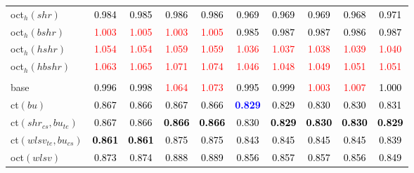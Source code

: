 \begin{tabular}[t]{l|ccccccccc}
oct$_h(shr)$ & \textcolor{black}{0.984} & \textcolor{black}{0.985} & \textcolor{black}{0.986} & \textcolor{black}{0.986} & \textcolor{black}{0.969} & \textcolor{black}{0.969} & \textcolor{black}{0.969} & \textcolor{black}{0.968} & \textcolor{black}{0.971}\\
oct$_h(bshr)$ & \textcolor{red}{1.003} & \textcolor{red}{1.005} & \textcolor{red}{1.003} & \textcolor{red}{1.005} & \textcolor{black}{0.985} & \textcolor{black}{0.987} & \textcolor{black}{0.987} & \textcolor{black}{0.986} & \textcolor{black}{0.987}\\
oct$_h(hshr)$ & \textcolor{red}{1.054} & \textcolor{red}{1.054} & \textcolor{red}{1.059} & \textcolor{red}{1.059} & \textcolor{red}{1.036} & \textcolor{red}{1.037} & \textcolor{red}{1.038} & \textcolor{red}{1.039} & \textcolor{red}{1.040}\\
oct$_h(hbshr)$ & \textcolor{red}{1.063} & \textcolor{red}{1.065} & \textcolor{red}{1.071} & \textcolor{red}{1.074} & \textcolor{red}{1.046} & \textcolor{red}{1.048} & \textcolor{red}{1.049} & \textcolor{red}{1.051} & \textcolor{red}{1.051}\\
\addlinespace[0.3em]
\multicolumn{10}{c}{\textbf{$k = 2$}}\\
base & \textcolor{black}{0.996} & \textcolor{black}{0.998} & \textcolor{red}{1.064} & \textcolor{red}{1.073} & \textcolor{black}{0.995} & \textcolor{black}{0.999} & \textcolor{red}{1.003} & \textcolor{red}{1.007} & \textcolor{black}{1.000}\\
ct$(bu)$ & \textcolor{black}{0.867} & \textcolor{black}{0.866} & \textcolor{black}{0.867} & \textcolor{black}{0.866} & \textcolor{blue}{\textbf{0.829}} & \textcolor{black}{0.829} & \textcolor{black}{0.830} & \textcolor{black}{0.830} & \textcolor{black}{0.831}\\
ct$(shr_{cs}, bu_{te})$ & \textcolor{black}{0.867} & \textcolor{black}{0.866} & \textcolor{black}{\textbf{0.866}} & \textcolor{black}{\textbf{0.866}} & \textcolor{black}{0.830} & \textcolor{black}{\textbf{0.829}} & \textcolor{black}{\textbf{0.830}} & \textcolor{black}{\textbf{0.830}} & \textcolor{black}{\textbf{0.829}}\\
ct$(wlsv_{te}, bu_{cs})$ & \textcolor{black}{\textbf{0.861}} & \textcolor{black}{\textbf{0.861}} & \textcolor{black}{0.875} & \textcolor{black}{0.875} & \textcolor{black}{0.843} & \textcolor{black}{0.845} & \textcolor{black}{0.845} & \textcolor{black}{0.845} & \textcolor{black}{0.839}\\
oct$(wlsv)$ & \textcolor{black}{0.873} & \textcolor{black}{0.874} & \textcolor{black}{0.888} & \textcolor{black}{0.889} & \textcolor{black}{0.856} & \textcolor{black}{0.857} & \textcolor{black}{0.857} & \textcolor{black}{0.856} & \textcolor{black}{0.849}\\

\end{tabular}
